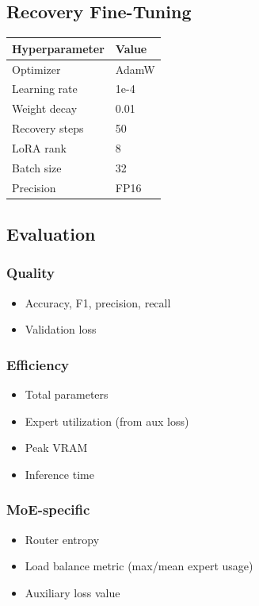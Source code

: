 \subsection{Recovery Fine-Tuning}

\begin{table}[H]
\centering
\small
\begin{tabular}{ll}
\toprule
\textbf{Hyperparameter} & \textbf{Value} \\
\midrule
Optimizer & AdamW \\
Learning rate & 1e-4 \\
Weight decay & 0.01 \\
Recovery steps & 50 \\
LoRA rank & 8 \\
Batch size & 32 \\
Precision & FP16 \\
\bottomrule
\end{tabular}
\end{table}

\subsection{Evaluation}

\subsubsection{Quality}
\begin{itemize}
\item Accuracy, F1, precision, recall
\item Validation loss

\end{itemize}
\subsubsection{Efficiency}
\begin{itemize}
\item Total parameters
\item Expert utilization (from aux loss)
\item Peak VRAM
\item Inference time

\end{itemize}
\subsubsection{MoE-specific}
\begin{itemize}
\item Router entropy
\item Load balance metric (max/mean expert usage)
\item Auxiliary loss value

\end{itemize}
